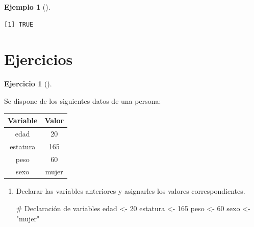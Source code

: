 \documentclass[
  a4paper,
]{scrreport}
\newenvironment{Shaded}{\begin{snugshade}}{\end{snugshade}}
\newcommand{\CommentTok}[1]{\textcolor[rgb]{0.37,0.37,0.37}{#1}}
\newcommand{\DecValTok}[1]{\textcolor[rgb]{0.68,0.00,0.00}{#1}}
\newcommand{\NormalTok}[1]{\textcolor[rgb]{0.00,0.23,0.31}{#1}}
\newcommand{\OtherTok}[1]{\textcolor[rgb]{0.00,0.23,0.31}{#1}}
\newcommand{\StringTok}[1]{\textcolor[rgb]{0.13,0.47,0.30}{#1}}
\theoremstyle{definition}
\newtheorem{exercise}{Ejercicio}[chapter]
\theoremstyle{definition}
\newtheorem{example}{Ejemplo}[chapter]
\theoremstyle{remark}
\begin{document}
\begin{example}[]
\begin{verbatim}
[1] TRUE
\end{verbatim}

\end{example}

\section{Ejercicios}\label{ejercicios}

\begin{exercise}[]\protect\hypertarget{exr-tipos-datos-1}{}\label{exr-tipos-datos-1}

Se dispone de los siguientes datos de una persona:

\begin{longtable}[]{@{}cc@{}}
\toprule\noalign{}
Variable & Valor \\
\midrule\noalign{}
\endhead
\bottomrule\noalign{}
\endlastfoot
edad & 20 \\
estatura & 165 \\
peso & 60 \\
sexo & mujer \\
\end{longtable}

\begin{enumerate}
\def\labelenumi{\alph{enumi}.}
\item
  Declarar las variables anteriores y asignarles los valores
  correspondientes.

  \begin{tcolorbox}[enhanced jigsaw, title=\textcolor{quarto-callout-note-color}{\faInfo}\hspace{0.5em}{Solución}, titlerule=0mm, toprule=.15mm, colbacktitle=quarto-callout-note-color!10!white, arc=.35mm, colframe=quarto-callout-note-color-frame, opacitybacktitle=0.6, coltitle=black, left=2mm, colback=white, opacityback=0, breakable, bottomrule=.15mm, toptitle=1mm, leftrule=.75mm, bottomtitle=1mm, rightrule=.15mm]

\begin{Shaded}
\begin{Highlighting}[]
\CommentTok{\# Declaración de variables}
\NormalTok{edad }\OtherTok{\textless{}{-}} \DecValTok{20}
\NormalTok{estatura }\OtherTok{\textless{}{-}} \DecValTok{165}
\NormalTok{peso }\OtherTok{\textless{}{-}} \DecValTok{60}
\NormalTok{sexo }\OtherTok{\textless{}{-}} \StringTok{"mujer"}
\end{Highlighting}
\end{Shaded}


\end{tcolorbox}
\end{enumerate}
\end{exercise}
\end{document}
